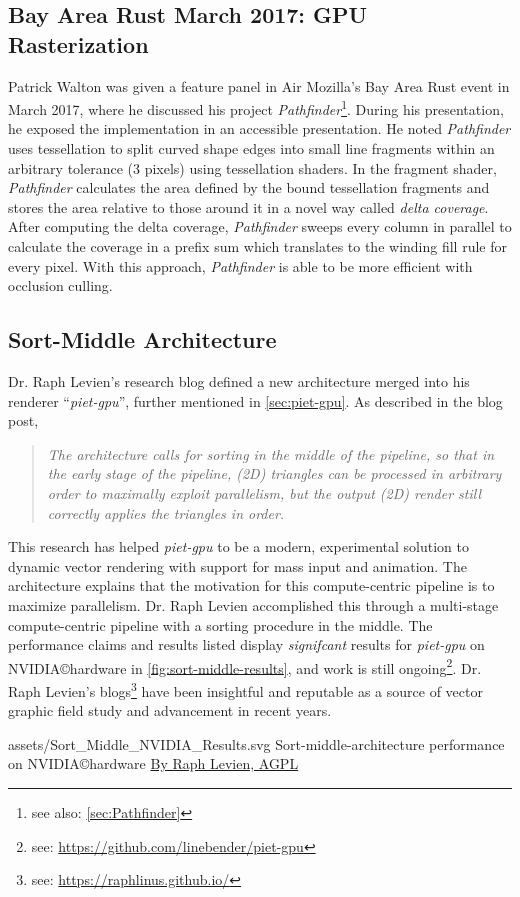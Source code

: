\subsection{Bay Area Rust March 2017: GPU Rasterization}
Patrick Walton was given a feature panel in Air Mozilla's Bay Area Rust event in March 2017, where he discussed his project \textit{Pathfinder}\footnote{see also: \cref{sec:Pathfinder}}. During his presentation, he exposed the implementation in an accessible presentation. He noted \textit{Pathfinder} uses tessellation to split curved shape edges into small line fragments within an arbitrary tolerance (3 pixels) using tessellation shaders. In the fragment shader, \textit{Pathfinder} calculates the area defined by the bound tessellation fragments and stores the area relative to those around it in a novel way called \textit{delta coverage}. After computing the delta coverage, \textit{Pathfinder} sweeps every column in parallel to calculate the coverage in a prefix sum which translates to the winding fill rule for every pixel\cite{Walton18}. With this approach, \textit{Pathfinder} is able to be more efficient with occlusion culling.

\subsection{Sort-Middle Architecture}
Dr. Raph Levien's research blog defined a new architecture merged into his renderer ``\textit{piet-gpu}'', further mentioned in \cref{sec:piet-gpu}. As described in the blog post\cite{Levien20},
\begin{quote}
\textit{The architecture calls for sorting in the middle of the pipeline, so that in the early stage of the pipeline, (2D) triangles can be processed in arbitrary order to maximally exploit parallelism, but the output (2D) render still correctly applies the triangles in order.}
\end{quote}
This research has helped \textit{piet-gpu} to be a modern, experimental solution to dynamic vector rendering with support for mass input and animation. The architecture explains that the motivation for this compute-centric pipeline is to maximize parallelism. Dr. Raph Levien accomplished this through a multi-stage compute-centric pipeline with a sorting procedure in the middle. The performance claims and results listed display \emph{signifcant} results for \textit{piet-gpu} on NVIDIA\copyright hardware in \cref{fig:sort-middle-results}, and work is still ongoing\footnote{see: \href{https://github.com/linebender/piet-gpu}{https://github.com/linebender/piet-gpu}}. Dr. Raph Levien's blogs\footnote{see: \href{https://raphlinus.github.io/}{https://raphlinus.github.io/}} have been insightful and reputable as a source of vector graphic field study and advancement in recent years.\medskip

\widesvg
{assets/Sort_Middle_NVIDIA_Results.svg}
{Sort-middle-architecture performance on NVIDIA\copyright hardware\label{fig:sort-middle-results}}
{\href{http://www.gnu.org/licenses/agpl.html}{By Raph Levien, AGPL}}\medskip

